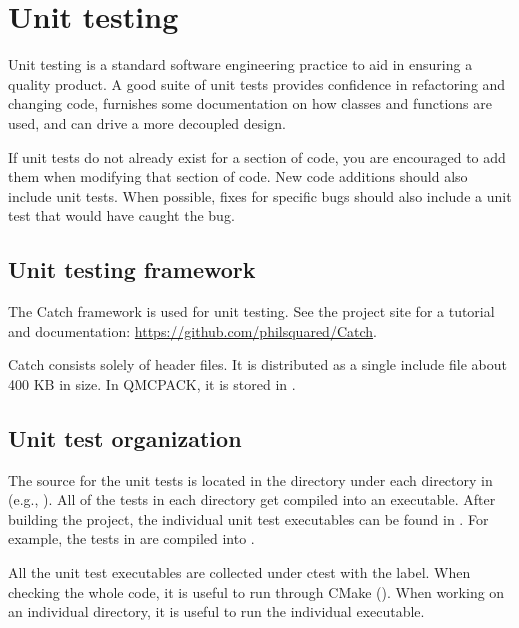 \chapter{Unit testing}
\label{chap:unit_testing}

Unit testing is a standard software engineering practice to aid in ensuring a quality product. A good suite of unit tests provides confidence in refactoring and changing code, furnishes some documentation on how classes and functions are used, and can drive a more decoupled design.

If unit tests do not already exist for a section of code, you are encouraged to add them when modifying that section of code.  New code additions should also include unit tests.
When possible, fixes for specific bugs should also include a unit test that would have caught the bug.

\section {Unit testing framework} The Catch framework is used for unit testing.
See the project site for a tutorial and documentation: \url{https://github.com/philsquared/Catch}.

Catch consists solely of header files. It is distributed as a single include file about 400 KB in size.  In QMCPACK, it is stored in .

\section{Unit test organization}

\begin{sloppypar}
The source for the unit tests is located in the  directory under each directory in  (e.g., ).
All of the tests in each  directory get compiled into an executable.
After building the project, the individual unit test executables can be found in .
For example, the tests in  are compiled into .
\end{sloppypar}

All the unit test executables are collected under ctest with the  label.
When checking the whole code, it is useful to run through CMake ().
When working on an individual directory, it is useful to run the individual executable.

